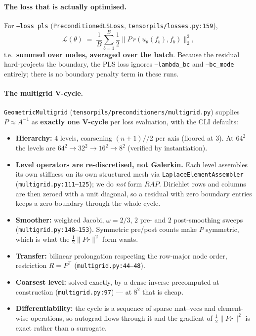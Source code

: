\documentclass[11pt]{article}
\newcommand{\Ainv}{A^{-1}}
\begin{document}
\paragraph{The loss that is actually optimised.}
For \texttt{--loss pls} (\texttt{PreconditionedLSLoss}, \texttt{tensorpils/losses.py:159}),
\begin{equation*}
  \mathcal{L}(\theta) \;=\; \frac{1}{B}\sum_{b=1}^{B} \frac12 \big\| P\,r(u_\theta(f_b), f_b) \big\|_2^2,
\end{equation*}
i.e.\ \textbf{summed over nodes, averaged over the batch}. Because the residual hard-projects the
boundary, the PLS loss ignores \texttt{--lambda\_bc} and \texttt{--bc\_mode} entirely; there is no
boundary penalty term in these runs.

\paragraph{The multigrid V-cycle.}
\texttt{GeometricMultigrid} (\texttt{tensorpils/preconditioners/multigrid.py}) supplies
$P \approx \Ainv$ as \textbf{exactly one V-cycle} per loss evaluation, with the CLI defaults:
\begin{itemize}
  \item \textbf{Hierarchy:} $4$ levels, coarsening $(n+1)//2$ per axis (floored at $3$). At $64^2$
        the levels are $64^2 \to 32^2 \to 16^2 \to 8^2$ (verified by instantiation).
  \item \textbf{Level operators are re-discretised, not Galerkin.} Each level assembles its own
        stiffness on its own structured mesh via \texttt{LaplaceElementAssembler}
        (\texttt{multigrid.py:111--125}); we do \emph{not} form $R A P$. Dirichlet rows and columns
        are then zeroed with a unit diagonal, so a residual with zero boundary entries keeps a zero
        boundary through the whole cycle.
  \item \textbf{Smoother:} weighted Jacobi, $\omega = 2/3$, $2$ pre- and $2$ post-smoothing sweeps
        (\texttt{multigrid.py:148--153}). Symmetric pre/post counts make $P$ symmetric, which is
        what the $\tfrac12\|Pr\|^2$ form wants.
  \item \textbf{Transfer:} bilinear prolongation respecting the row-major node order, restriction
        $R = P^\top$ (\texttt{multigrid.py:44--48}).
  \item \textbf{Coarsest level:} solved exactly, by a dense inverse precomputed at construction
        (\texttt{multigrid.py:97}) --- at $8^2$ that is cheap.
  \item \textbf{Differentiability:} the cycle is a sequence of sparse mat--vecs and element-wise
        operations, so autograd flows through it and the gradient of $\tfrac12\|Pr\|^2$ is exact
        rather than a surrogate.
\end{itemize}
\end{document}
